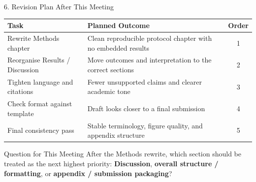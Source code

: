 \documentclass[aspectratio=169, 11pt]{beamer}
\begin{document}
\begin{frame}[shrink=6]{6. Revision Plan After This Meeting}

    \begin{table}
        \centering
        \small
        \begin{tabular}{p{5.0cm}p{5.4cm}c}
            \toprule
            \textbf{Task} & \textbf{Planned Outcome} & \textbf{Order} \\
            \midrule
            Rewrite Methods chapter
            & Clean reproducible protocol chapter with no embedded results
            & 1 \\
            Reorganise Results / Discussion
            & Move outcomes and interpretation to the correct sections
            & 2 \\
            Tighten language and citations
            & Fewer unsupported claims and clearer academic tone
            & 3 \\
            Check format against template
            & Draft looks closer to a final submission
            & 4 \\
            Final consistency pass
            & Stable terminology, figure quality, and appendix structure
            & 5 \\
            \bottomrule
        \end{tabular}
    \end{table}

    \vspace{2mm}
    \begin{alertblock}{Question for This Meeting}
        After the Methods rewrite, which section should be treated as the next highest priority: \textbf{Discussion}, \textbf{overall structure / formatting}, or \textbf{appendix / submission packaging}?
    \end{alertblock}
\end{frame}
\end{document}
